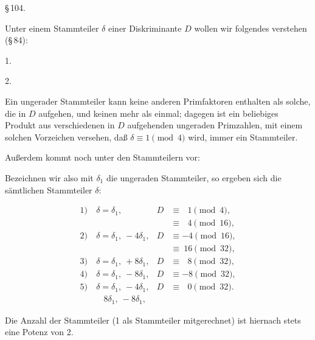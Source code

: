 \S\,104. 

Unter einem Stammteiler $\delta$ einer Diskriminante $D$ wollen
wir folgendes verstehen (\S\,84):

1. 

2. 

Ein ungerader Stammteiler kann keine anderen Primfaktoren
enthalten als solche, die in $D$ aufgehen, und keinen mehr als
einmal; dagegen ist ein beliebiges Produkt aus verschiedenen in
$D$ aufgehenden ungeraden Primzahlen, mit einem solchen Vorzeichen
 versehen, daß $\delta \equiv 1 \pmod{4}$ wird, immer ein Stammteiler.

Außerdem kommt noch unter den Stammteilern vor:


Bezeichnen wir also mit $\delta_1$ die ungeraden Stammteiler, so
ergeben sich die sämtlichen Stammteiler $\delta$:

\[
\begin{aligned}
1)\ & \delta = \delta_1, & D &\equiv\ \ \ 1 \pmod{4}, \\
& & &\equiv\ \ \ 4 \pmod{16}, \\
2)\ & \delta = \delta_1,\ -4\delta_1, & D &\equiv -4 \pmod{16}, \\
& & &\equiv\ 16 \pmod{32}, \\
3)\ & \delta = \delta_1,\ +8\delta_1, & D &\equiv\ \ \ 8 \pmod{32}, \\
4)\ & \delta = \delta_1,\ -8\delta_1, & D &\equiv -8 \pmod{32}, \\
5)\ & \delta = \delta_1,\ -4\delta_1, & D &\equiv\ \ \ 0 \pmod{32}. \\
& \ \ \ \ 8\delta_1,\ -8\delta_1, & &
\end{aligned}
\]

Die Anzahl der Stammteiler (1 als Stammteiler mitgerechnet)
ist hiernach stets eine Potenz von 2.

